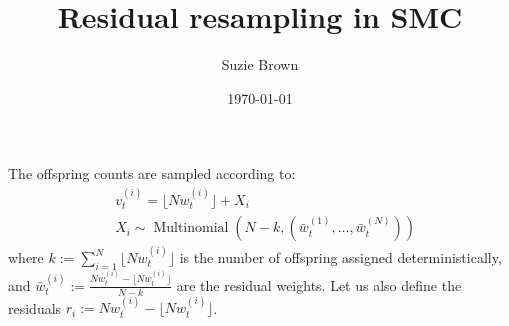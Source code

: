 \documentclass[fleqn]{article}
\title{Residual resampling in SMC}
\author{Suzie Brown}
\date{\today}
\newcommand{\Mn}{\operatorname{Multinomial}}
\newcommand{\vt}[2][t]{v_{#1}^{(#2)}}
\newcommand{\wt}[2][t]{w_{#1}^{(#2)}}
\newcommand{\wbar}[2][t]{\bar{w}_{#1}^{(#2)}}
\begin{document}
\maketitle
\thispagestyle{fancy}

%
%
%

%
%
The offspring counts are sampled according to:
\begin{align*}
& \vt{i} = \lfloor N \wt{i} \rfloor + X_i \\
& X_i \sim \Mn (N-k, (\wbar{1}, \dots, \wbar{N}))
\end{align*}
where $k := \sum_{i=1}^N \lfloor N \wt{i} \rfloor$ is the number of offspring assigned deterministically, and $\wbar{i} := \frac{N\wt{i} - \lfloor N \wt{i} \rfloor}{N - k}$ are the residual weights. Let us also define the residuals $r_i := N\wt{i} - \lfloor N \wt{i} \rfloor$.
\end{document}
